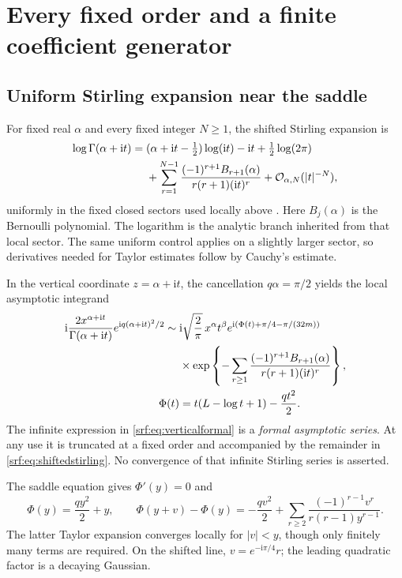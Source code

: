\documentclass[11pt]{article}
\theoremstyle{remark}\newtheorem{remark}[theorem]{Remark}
\newcommand{\OO}{\mathcal O}
\newcommand{\ii}{\mathrm i}
\begin{document}
\section{Every fixed order and a finite coefficient generator}\label{srf:sec:coefficients}
\subsection{Uniform Stirling expansion near the saddle}
For fixed real $\alpha$ and every fixed integer $N\ge1$, the shifted Stirling expansion is
\begin{align}
 \log\Gamma(\alpha+\ii t)
 ={}&(\alpha+\ii t-\tfrac12)\log(\ii t)-\ii t
       +\tfrac12\log(2\pi)\notag\\
 &+\sum_{r=1}^{N-1}
 \frac{(-1)^{r+1}B_{r+1}(\alpha)}{r(r+1)(\ii t)^r}
       +\OO_{\alpha,N}(|t|^{-N}),\label{srf:eq:shiftedstirling}
\end{align}
uniformly in the fixed closed sectors used locally above \cite[Section 5.11]{dlmfgamma}. Here $B_j(\alpha)$ is the Bernoulli polynomial. The logarithm is the analytic branch inherited from that local sector. The same uniform control applies on a slightly larger sector, so derivatives needed for Taylor estimates follow by Cauchy's estimate.

In the vertical coordinate $z=\alpha+\ii t$, the cancellation $q\alpha=\pi/2$ yields the local asymptotic integrand
\begin{align}
 \ii\frac{2x^{\alpha+\ii t}}{\Gamma(\alpha+\ii t)}
                  e^{\ii q(\alpha+\ii t)^2/2}
 \sim{}&\ii\sqrt{\frac2\pi}\,x^\alpha t^\beta
     e^{\ii(\Phi(t)+\pi/4-\pi/(32m))}\notag\\
 &\times\exp\left\{-\sum_{r\ge1}
  \frac{(-1)^{r+1}B_{r+1}(\alpha)}{r(r+1)(\ii t)^r}\right\},\label{srf:eq:verticalformal}\\
 \Phi(t)&=t(L-\log t+1)-\frac{qt^2}{2}.\label{srf:eq:Phi}
\end{align}
The infinite expression in \eqref{srf:eq:verticalformal} is a \emph{formal asymptotic series}. At any use it is truncated at a fixed order and accompanied by the remainder in \eqref{srf:eq:shiftedstirling}. No convergence of that infinite Stirling series is asserted.

The saddle equation gives $\Phi'(y)=0$ and
\begin{equation}\label{srf:eq:phiexpand}
 \Phi(y)=\frac{qy^2}{2}+y,\qquad
 \Phi(y+v)-\Phi(y)
 =-\frac{qv^2}{2}
 +\sum_{r\ge2}\frac{(-1)^{r-1}v^r}{r(r-1)y^{r-1}}.
\end{equation}
The latter Taylor expansion converges locally for $|v|<y$, though only finitely many terms are required. On the shifted line, $v=e^{-\ii\pi/4}r$; the leading quadratic factor is a decaying Gaussian.
\end{document}

